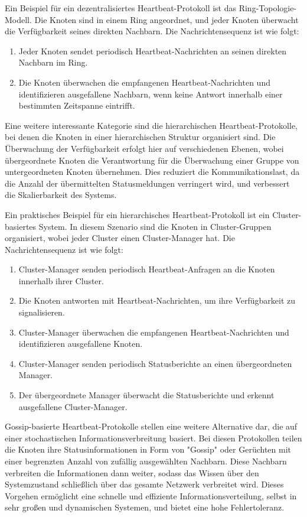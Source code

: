 Ein Beispiel für ein dezentralisiertes Heartbeat-Protokoll ist das Ring-Topologie-Modell. Die Knoten sind in einem Ring angeordnet, und jeder Knoten überwacht die Verfügbarkeit seines direkten Nachbarn. Die Nachrichtensequenz ist wie folgt:
\begin{enumerate}[label=(\alph*)]
\item Jeder Knoten sendet periodisch Heartbeat-Nachrichten an seinen direkten Nachbarn im Ring.
\item Die Knoten überwachen die empfangenen Heartbeat-Nachrichten und identifizieren ausgefallene Nachbarn, wenn keine Antwort innerhalb einer bestimmten Zeitspanne eintrifft.
\end{enumerate}

Eine weitere interessante Kategorie sind die hierarchischen Heartbeat-Protokolle, bei denen die Knoten in einer hierarchischen Struktur organisiert sind. Die Überwachung der Verfügbarkeit erfolgt hier auf verschiedenen Ebenen, wobei übergeordnete Knoten die Verantwortung für die Überwachung einer Gruppe von untergeordneten Knoten übernehmen. Dies reduziert die Kommunikationslast, da die Anzahl der übermittelten Statusmeldungen verringert wird, und verbessert die Skalierbarkeit des Systems.

Ein praktisches Beispiel für ein hierarchisches Heartbeat-Protokoll ist ein Cluster-basiertes System. In diesem Szenario sind die Knoten in Cluster-Gruppen organisiert, wobei jeder Cluster einen Cluster-Manager hat. Die Nachrichtensequenz ist wie folgt:
\begin{enumerate}[label=(\alph*)]
\item Cluster-Manager senden periodisch Heartbeat-Anfragen an die Knoten innerhalb ihrer Cluster.
\item Die Knoten antworten mit Heartbeat-Nachrichten, um ihre Verfügbarkeit zu signalisieren.
\item Cluster-Manager überwachen die empfangenen Heartbeat-Nachrichten und identifizieren ausgefallene Knoten.
\item Cluster-Manager senden periodisch Statusberichte an einen übergeordneten Manager.
\item Der übergeordnete Manager überwacht die Statusberichte und erkennt ausgefallene Cluster-Manager.
\end{enumerate}

Gossip-basierte Heartbeat-Protokolle stellen eine weitere Alternative dar, die auf einer stochastischen Informationsverbreitung basiert. Bei diesen Protokollen teilen die Knoten ihre Statusinformationen in Form von "Gossip" oder Gerüchten mit einer begrenzten Anzahl von zufällig ausgewählten Nachbarn. Diese Nachbarn verbreiten die Informationen dann weiter, sodass das Wissen über den Systemzustand schließlich über das gesamte Netzwerk verbreitet wird. Dieses Vorgehen ermöglicht eine schnelle und effiziente Informationsverteilung, selbst in sehr großen und dynamischen Systemen, und bietet eine hohe Fehlertoleranz.

